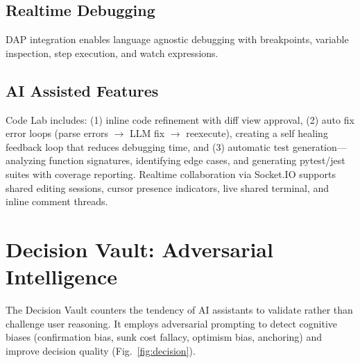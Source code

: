 \documentclass[conference]{IEEEtran}
\begin{document}
\subsection{Realtime Debugging}
DAP integration enables language agnostic debugging with breakpoints, variable inspection, step execution, and watch expressions.

\subsection{AI Assisted Features}
Code Lab includes: (1) inline code refinement with diff view approval, (2) auto fix error loops (parse errors $\rightarrow$ LLM fix $\rightarrow$ reexecute), creating a self healing feedback loop that reduces debugging time, and (3) automatic test generation—analyzing function signatures, identifying edge cases, and generating pytest/jest suites with coverage reporting. Realtime collaboration via Socket.IO supports shared editing sessions, cursor presence indicators, live shared terminal, and inline comment threads.


\section{Decision Vault: Adversarial Intelligence}

The Decision Vault counters the tendency of AI assistants to validate rather than challenge user reasoning. It employs adversarial prompting to detect cognitive biases (confirmation bias, sunk cost fallacy, optimism bias, anchoring) and improve decision quality (Fig.~\ref{fig:decision}).
\end{document}
